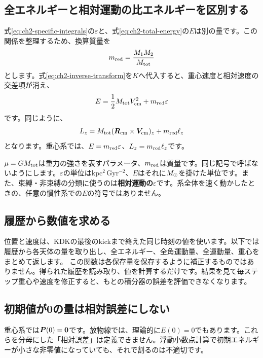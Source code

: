 \subsection{全エネルギーと相対運動の比エネルギーを区別する}
式\eqref{eq:ch2-specific-integrals}の$\varepsilon$と、式\eqref{eq:ch2-total-energy}の$E$は別の量です。この関係を整理するため、換算質量を
\begin{equation}
m_{\rm red}=\frac{M_1M_2}{M_{\rm tot}}
\label{eq:ch2-reduced-mass}
\end{equation}
とします。式\eqref{eq:ch2-inverse-transform}を$K$へ代入すると、重心速度と相対速度の交差項が消え、
\begin{equation}
E=\frac12M_{\rm tot} V_{\rm cm}^2+m_{\rm red}\varepsilon
\label{eq:ch2-energy-decomposition}
\end{equation}
です。同じように、
\begin{equation}
L_z=M_{\rm tot}(\boldsymbol R_{\rm cm}\times\boldsymbol V_{\rm cm})_z+m_{\rm red}\ell_z
\label{eq:ch2-angular-decomposition}
\end{equation}
となります。重心系では、$E=m_{\rm red}\varepsilon$、$L_z=m_{\rm red}\ell_z$です。\cite{ryden2025}

$\mu=GM_{\rm tot}$は重力の強さを表すパラメータ、$m_{\rm red}$は質量です。同じ記号で呼ばないようにします。$\varepsilon$の単位は$\mathrm{kpc^2\,Gyr^{-2}}$、$E$はそれに$M_\odot$を掛けた単位です。また、束縛・非束縛の分類に使うのは\textbf{相対運動の}$\varepsilon$です。系全体を速く動かしたときの、任意の慣性系での$E$の符号ではありません。

\subsection{履歴から数値を求める}
位置と速度は、KDKの最後のkickまで終えた同じ時刻の値を使います。以下では履歴から各天体の量を取り出し、全エネルギー、全角運動量、全運動量、重心をまとめて返します。
この関数は各保存量を保存するように補正するものではありません。得られた履歴を読み取り、値を計算するだけです。結果を見て毎ステップ重心や速度を修正すると、もとの積分器の誤差を評価できなくなります。

\subsection{初期値が0の量は相対誤差にしない}
重心系では$\boldsymbol P(0)=\boldsymbol 0$です。放物線では、理論的に$E(0)=0$でもあります。これらを分母にした「相対誤差」は定義できません。浮動小数点計算で初期エネルギーが小さな非零値になっていても、それで割るのは不適切です。

